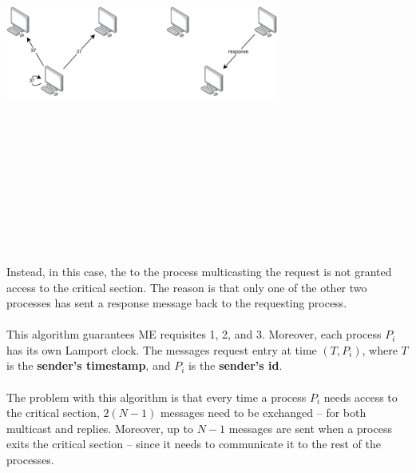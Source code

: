 \documentclass{article}
\begin{document}
\begin{center}
	\includegraphics[width=9cm, height=13cm, keepaspectratio]{assets/multicast-2.pdf}
\end{center}
Instead, in this case, the to the process multicasting the request is not granted access to the critical section. The reason is that only one of the other two processes has sent a response message back to the requesting process. \\ \\
This algorithm guarantees ME requisites 1, 2, and 3. Moreover, each process $P_i$ has its own Lamport clock. The messages request entry at time $(T, P_i)$, where $T$ is the \textbf{sender's timestamp}, and $P_i$ is the \textbf{sender's id}. \\ \\
The problem with this algorithm is that every time a process $P_i$ needs access to the critical section, $2(N-1)$ messages need to be exchanged -- for both multicast and replies. Moreover, up to $N - 1$ messages are sent when a process exits the critical section -- since it needs to communicate it to the rest of the processes.
\end{document}
